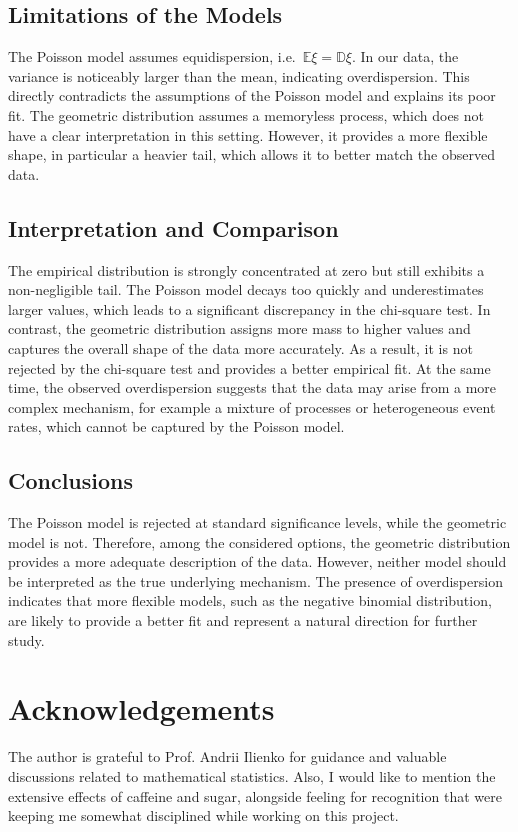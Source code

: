 \documentclass[final,3p,times,onecolumn]{elsarticle}
\begin{document}
\subsection{Limitations of the Models}
The Poisson model assumes equidispersion, i.e.\ $\mathbb{E}\xi = \mathbb{D}\xi$. 
In our data, the variance is noticeably larger than the mean, indicating overdispersion. 
This directly contradicts the assumptions of the Poisson model and explains its poor fit.
The geometric distribution assumes a memoryless process, which does not have a clear interpretation in this setting. 
However, it provides a more flexible shape, in particular a heavier tail, which allows it to better match the observed data.

\subsection{Interpretation and Comparison}

The empirical distribution is strongly concentrated at zero but still exhibits a non-negligible tail. 
The Poisson model decays too quickly and underestimates larger values, which leads to a significant discrepancy in the chi-square test.
In contrast, the geometric distribution assigns more mass to higher values and captures the overall shape of the data more accurately. 
As a result, it is not rejected by the chi-square test and provides a better empirical fit.
At the same time, the observed overdispersion suggests that the data may arise from a more complex mechanism, 
for example a mixture of processes or heterogeneous event rates, which cannot be captured by the Poisson model.

\subsection{Conclusions}

The Poisson model is rejected at standard significance levels, while the geometric model is not. 
Therefore, among the considered options, the geometric distribution provides a more adequate description of the data.
However, neither model should be interpreted as the true underlying mechanism. 
The presence of overdispersion indicates that more flexible models, such as the negative binomial distribution, 
are likely to provide a better fit and represent a natural direction for further study.

\section*{Acknowledgements}

The author is grateful to Prof. Andrii Ilienko for guidance and valuable discussions related to mathematical statistics.
Also, I would like to mention the extensive effects of caffeine and sugar, alongside feeling for recognition 
that were keeping me somewhat disciplined while working on this project.



\end{document}
